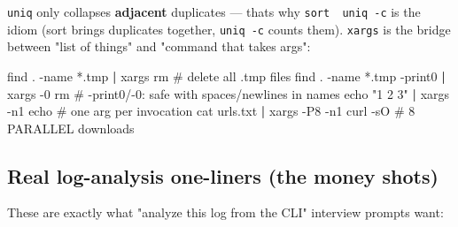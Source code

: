 \documentclass[11pt]{article}
\newenvironment{Shaded}{\begin{snugshade}}{\end{snugshade}}
\newcommand{\AttributeTok}[1]{\textcolor[rgb]{0.16,0.50,0.73}{#1}}
\newcommand{\BuiltInTok}[1]{\textcolor[rgb]{0.50,0.55,0.55}{#1}}
\newcommand{\CommentTok}[1]{\textcolor[rgb]{0.48,0.49,0.49}{#1}}
\newcommand{\FunctionTok}[1]{\textcolor[rgb]{0.56,0.27,0.68}{#1}}
\newcommand{\KeywordTok}[1]{\textcolor[rgb]{0.81,0.81,0.76}{\textbf{#1}}}
\newcommand{\NormalTok}[1]{\textcolor[rgb]{0.81,0.81,0.76}{#1}}
\newcommand{\StringTok}[1]{\textcolor[rgb]{0.96,0.31,0.31}{#1}}
\begin{document}
\texttt{uniq} only collapses \textbf{adjacent} duplicates --- that\textquotesingle s why \texttt{sort\ \textbar{}\ uniq\ -c} is the idiom (sort brings duplicates together, \texttt{uniq\ -c} counts them). \texttt{xargs} is the bridge between "list of things" and "command that takes args":


\begin{Shaded}
\begin{Highlighting}[]
\FunctionTok{find}\NormalTok{ . }\AttributeTok{{-}name} \StringTok{\textquotesingle{}*.tmp\textquotesingle{}} \KeywordTok{|} \FunctionTok{xargs}\NormalTok{ rm          }\CommentTok{\# delete all .tmp files}
\FunctionTok{find}\NormalTok{ . }\AttributeTok{{-}name} \StringTok{\textquotesingle{}*.tmp\textquotesingle{}} \AttributeTok{{-}print0} \KeywordTok{|} \FunctionTok{xargs} \AttributeTok{{-}0}\NormalTok{ rm   }\CommentTok{\# {-}print0/{-}0: safe with spaces/newlines in names}
\BuiltInTok{echo} \StringTok{"1 2 3"} \KeywordTok{|} \FunctionTok{xargs} \AttributeTok{{-}n1}\NormalTok{ echo            }\CommentTok{\# one arg per invocation}
\FunctionTok{cat}\NormalTok{ urls.txt }\KeywordTok{|} \FunctionTok{xargs} \AttributeTok{{-}P8} \AttributeTok{{-}n1}\NormalTok{ curl }\AttributeTok{{-}sO}    \CommentTok{\# 8 PARALLEL downloads}
\end{Highlighting}
\end{Shaded}

\subsection{Real log-analysis one-liners (the money shots)}\label{real-log-analysis-one-liners-the-money-shots}

These are exactly what "analyze this log from the CLI" interview prompts want:

\end{document}
